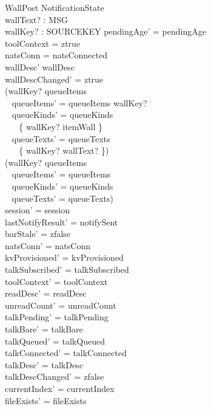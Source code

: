\documentclass[a4paper,10pt,fleqn]{article}
\begin{document}
\begin{schema}{WallPost}
  \Delta NotificationState \\
  wallText? : MSG \\
  wallKey? : SOURCEKEY
  \where
  pendingAge' = pendingAge \\
  toolContext = ztrue \\
  natsConn = natsConnected \\
  wallDesc' \neq wallDesc \\
  wallDescChanged' = ztrue \\
  (wallKey? \notin \ran queueItems \implies \\
  \quad~ queueItems' = queueItems \cat \langle wallKey? \rangle \land \\
  \quad~ queueKinds' = queueKinds \cup \\
  \quad~ \quad~ \{ wallKey? \mapsto itemWall \} \land \\
  \quad~ queueTexts' = queueTexts \cup \\
  \quad~ \quad~ \{ wallKey? \mapsto wallText? \}) \\
  (wallKey? \in \ran queueItems \implies \\
  \quad~ queueItems' = queueItems \land \\
  \quad~ queueKinds' = queueKinds \land \\
  \quad~ queueTexts' = queueTexts) \\
  session' = session \\
  lastNotifyResult' = notifySent \\
  barStale' = zfalse \\
  natsConn' = natsConn \\
  kvProvisioned' = kvProvisioned \\
  talkSubscribed' = talkSubscribed \\
  toolContext' = toolContext \\
  readDesc' = readDesc \\
  unreadCount' = unreadCount \\
  talkPending' = talkPending \\
  talkBare' = talkBare \\
  talkQueued' = talkQueued \\
  talkConnected' = talkConnected \\
  talkDesc' = talkDesc \\
  talkDescChanged' = zfalse \\
  currentIndex' = currentIndex \\
  fileExists' = fileExists \\

\end{schema}
\end{document}
